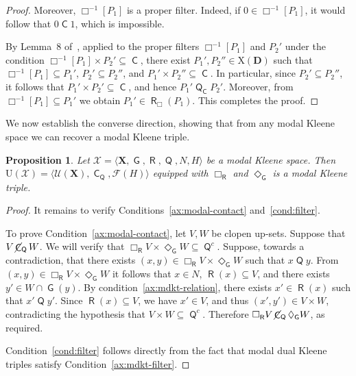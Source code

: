 \documentclass[10pt,a4paper]{amsart}
\newtheorem{proposition}[theorem]{Proposition}
\DeclareMathOperator{\con}{\mathsf{C}}
\DeclareMathOperator{\notcon}{\cancel{ \con}}
\DeclareMathOperator{\Q}{\mathsf{Q}}
\DeclareMathOperator{\G}{\mathsf{G}}
\DeclareMathOperator{\R}{\mathsf{R}}
\newcommand{\D}{\mathbf{D}}
\newcommand{\X}{\mathbf{X}}
\newcommand{\U}{\mathcal{U}}
\begin{document}
\begin{proof}
Moreover, $\Box^{-1}[P_1]$ is a proper filter. Indeed, if $0 \in \Box^{-1}[P_1]$, it would follow that $0 \con 1$, which is impossible.

By Lemma~8 of~\cite{duntsch2008distributive}, applied to the proper filters $\Box^{-1}[P_1]$ and $P_2'$ under the condition $\Box^{-1}[P_1] \times P_2' \subseteq \con$, there exist $P_1', P_2'' \in \mathrm{X}(\D)$ such that $\Box^{-1}[P_1] \subseteq P_1'$, $P_2' \subseteq P_2''$, and $P_1' \times P_2'' \subseteq \con$. In particular, since $P_2' \subseteq P_2''$, it follows that $P_1' \times P_2' \subseteq \con$, and hence $P_1'\Q_{\con} P_2'$. Moreover, from $\Box^{-1}[P_1] \subseteq P_1'$ we obtain $P_1' \in \R_\Box(P_1)$. This completes the proof.
\end{proof}

We now establish the converse direction, showing that from any modal Kleene space we can recover a modal Kleene triple.

\begin{proposition}
\label{prop:mdkt-to-triple}
Let $\mathcal{X} = \langle \X, \G, \R, \Q,N, H \rangle$ be a modal Kleene space. Then $\mathrm{U}(\mathcal{X}) = \langle \U(\X), \con_{\Q}, \mathcal{F}(H) \rangle$ equipped with $\Box_{\R}$ and $\Diamond_{\G}$ is a modal Kleene triple.
\end{proposition}
\begin{proof}
It remains to verify Conditions~\eqref{ax:modal-contact} and~\eqref{cond:filter}. 

To prove Condition~\eqref{ax:modal-contact}, let $V, W$ be clopen up-sets. Suppose that $V \notcon_{\Q} W$. We will verify that $\Box_{\R} V \times \Diamond_{\G} W \subseteq \Q^c$. Suppose, towards a contradiction, that there exists $(x,y) \in \Box_{\R} V \times \Diamond_{\G} W$ such that $x \Q y$. From $(x,y) \in \Box_{\R} V \times \Diamond_{\G} W$ it follows that $x \in N$, $\R(x) \subseteq V$, and there exists $y' \in W \cap \G(y)$. By condition~\eqref{ax:mdkt-relation}, there exists $x' \in \R(x)$ such that $x'\Q y'$. Since $\R(x) \subseteq V$, we have $x' \in V$, and thus $(x', y') \in V \times W$, contradicting the hypothesis that $V \times W \subseteq \Q^c$. Therefore $\Box_{\R} V \notcon_{\Q} \Diamond_{\G} W$, as required. 

Condition~\eqref{cond:filter} follows directly from the fact that modal dual Kleene triples satisfy Condition~\eqref{ax:mdkt-filter}.
\end{proof}
\end{document}
